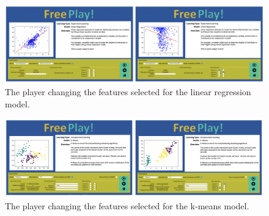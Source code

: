 		\begin{figure}[b]
			\begin{center}
				\includegraphics[width=13cm]{graphics/lr_changing_xy.png}
				\caption{The player changing the features selected for the linear regression model.}
				\label{fig:lr_changing_xy}
			\end{center}
		\end{figure}

		\begin{figure}[t]
			\begin{center}
				\includegraphics[width=13cm]{graphics/km_change_xy.png}
				\caption{The player changing the features selected for the k-means model.}
				\label{fig:km_change_xy}
			\end{center}
		\end{figure}
		
